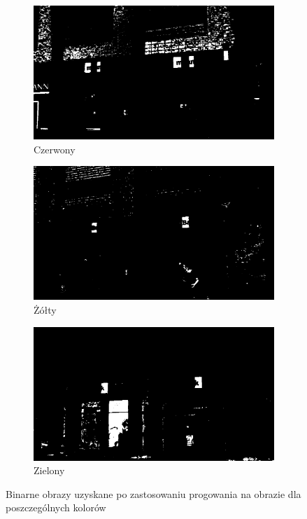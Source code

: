 \begin{figure}[h]
\centering
\begin{subfigure}{.3\textwidth}
  \centering
  \includegraphics[width=.8\linewidth]{figures/img4_thresh_red.png}
  \caption{Czerwony}
  \label{fig:sfig1}
\end{subfigure}
\begin{subfigure}{.3\textwidth}
  \centering
  \includegraphics[width=.8\linewidth]{figures/img4_thresh_yellow.png}
  \caption{Żółty}
  \label{fig:sfig2}
\end{subfigure}
\begin{subfigure}{.3\textwidth}
  \centering
  \includegraphics[width=.8\linewidth]{figures/img4_thresh_green.png}
  \caption{Zielony}
  \label{fig:sfig2}
\end{subfigure}
\caption{Binarne obrazy uzyskane po zastosowaniu progowania na obrazie  dla poszczególnych kolorów}
\label{fig:progowanie_kolory}
\end{figure}


